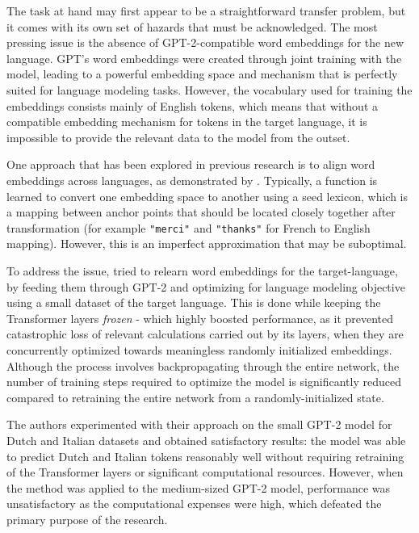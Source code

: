 \documentclass{article}
\begin{document}
\medskip
\noindent
The task at hand may first appear to be a straightforward transfer problem, but it comes with its own set of hazards that must be acknowledged. The most pressing issue is the absence of GPT-2-compatible word embeddings for the new language. GPT's word embeddings were created through joint training with the model, leading to a powerful embedding space and mechanism that is perfectly suited for language modeling tasks. However, the vocabulary used for training the embeddings consists mainly of English tokens, which means that without a compatible embedding mechanism for tokens in the target language, it is impossible to provide the relevant data to the model from the outset.

\medskip
\noindent
One approach that has been explored in previous research is to align word embeddings across languages, as demonstrated by \citet{rudertheman}. Typically, a function is learned to convert one embedding space to another using a seed lexicon, which is a mapping between anchor points that should be located closely together after transformation (for example \texttt{"merci"} and \texttt{"thanks"} for French to English mapping). However, this is an imperfect approximation that may be suboptimal.

\medskip
\noindent
To address the issue, \citet{deVries2020recycle} tried to relearn word embeddings for the target-language, by feeding them through GPT-2 and optimizing for language modeling objective using a small dataset of the target language. This is done while keeping the Transformer layers \emph{frozen} - which highly boosted performance, as it prevented catastrophic loss of relevant calculations carried out by its layers, when they are concurrently optimized towards meaningless randomly initialized embeddings. Although the process involves backpropagating through the entire network, the number of training steps required to optimize the model is significantly reduced compared to retraining the entire network from a randomly-initialized state.

\medskip
\noindent
The authors experimented with their approach on the small GPT-2 model for Dutch and Italian datasets and obtained satisfactory results: the model was able to predict Dutch and Italian tokens reasonably well without requiring retraining of the Transformer layers or significant computational resources. However, when the method was applied to the medium-sized GPT-2 model, performance was unsatisfactory as the computational expenses were high, which defeated the primary purpose of the research.
\end{document}
